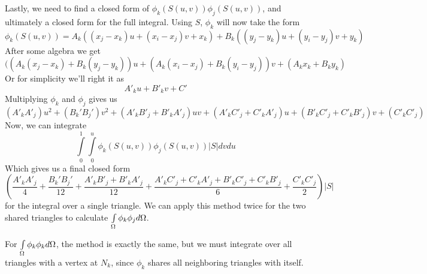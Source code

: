 Lastly, we need to find a closed form of $\phi_k(S(u,v))\phi_j(S(u,v))$, and ultimately a closed form for the full
integral. Using $S$, $\phi_k$ will now take the form
\begin{equation}
\phi_k(S(u,v)) = A_k ((x_j - x_k)u + (x_i - x_j)v + x_k) + B_k((y_j - y_k)u + (y_i - y_j)v + y_k)
\end{equation}
After some algebra we get
\begin{equation}
((A_k(x_j-x_k) + B_k(y_j-y_k))u + (A_k(x_i-x_j) + B_k(y_i-y_j))v + (A_k x_k + B_k y_k)
\end{equation}
Or for simplicity we'll right it as
\begin{equation}
A'_k u + B'_k v + C'
\end{equation}
Multiplying $\phi_k$ and $\phi_j$ gives us
\begin{equation}
(A'_k A'_j)u^2 + (B_k'B_j')v^2 + (A'_k B'_j + B'_k A'_j)uv + (A'_k C'_j + C'_k A'_j)u
+ (B'_kC'_j + C'_kB'_j)v + (C'_k C'_j)
\end{equation}
Now, we can integrate
\begin{equation}
\int\limits_0^1\int\limits_0^u \phi_k(S(u,v)) \phi_j(S(u,v)) |S| dvdu
\end{equation}
Which gives us a final closed form
\begin{equation}
\left(\frac{A'_k A'_j}{4} + \frac{B_k'B_j'}{12} + \frac{A'_k B'_j + B'_k A'_j}{12} +
\frac{A'_k C'_j + C'_k A'_j + B'_kC'_j + C'_kB'_j}{6} + \frac{C'_k C'_j}{2}
\right) |S|
\end{equation}
for the integral over a single triangle. We can apply this method twice for the two shared triangles to calculate
$\int\limits_{\Omega} \phi_k \phi_j d\Omega$.

For $\int\limits_{\Omega} \phi_k \phi_k d\Omega$, the method is exactly the same, but we must integrate over all triangles with a
vertex at $N_k$, since $\phi_k$ shares all neighboring triangles with itself.
